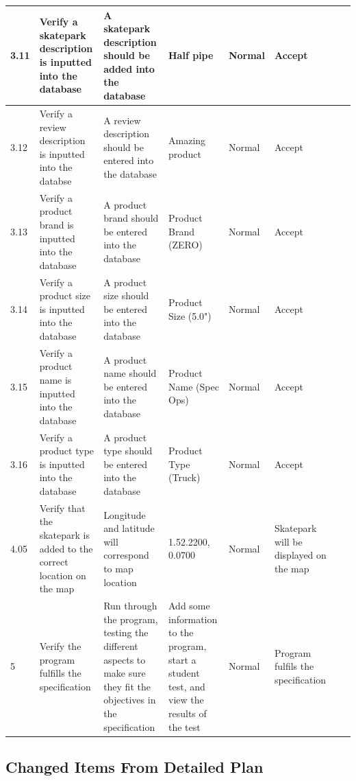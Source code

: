 \begin{landscape}
\begin{center}
\begin{longtable}{|p{1.5cm}|p{2.5cm}|p{2.5cm}|p{2cm}|p{2cm}|p{2cm}|p{2cm}|p{2cm}|}
3.11 & Verify a skatepark description is inputted into the database & A skatepark description should be added into the database & Half pipe & Normal & Accept & & \\ \hline

3.12 & Verify a review description is inputted into the databse & A review description should be entered into the database & Amazing product & Normal & Accept & & \\ \hline
 
3.13 & Verify a product brand is inputted into the database & A product brand should be entered into the database & Product Brand (ZERO) & Normal & Accept & & \\ \hline

3.14 & Verify a product size is inputted into the database & A product size should be entered into the database & Product Size (5.0") & Normal & Accept && \\ \hline

3.15 & Verify a product name is inputted into the database & A product name should be entered into the database & Product Name (Spec Ops) & Normal & Accept & & \\ \hline

3.16 & Verify a product type is inputted into the database & A product type should be entered into the database & Product Type (Truck) & Normal & Accept & & \\ \hline



4.05 & Verify that the skatepark is added to the correct location on the map & Longitude and latitude will correspond to map location & 1.52.2200, 0.0700 & Normal & Skatepark will be displayed on the map & & \\ \hline




5 & Verify the program fulfills the specification & Run through the program, testing the different aspects to make sure they fit the objectives in the specification & Add some information to the program, start a student test, and view the results of the test & Normal & Program fulfils the specification & & \\ \hline


    \end{longtable}
\end{center}

\subsection{Changed Items From Detailed Plan}


\end{landscape}

